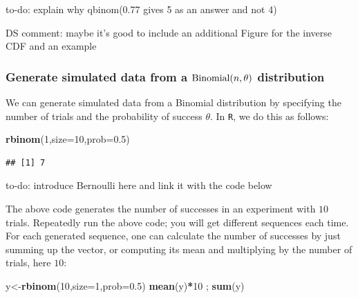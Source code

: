 \documentclass[12pt,]{krantz}
\newenvironment{Shaded}{\begin{snugshade}}{\end{snugshade}}
\newcommand{\DataTypeTok}[1]{\textcolor[rgb]{0.13,0.29,0.53}{#1}}
\newcommand{\DecValTok}[1]{\textcolor[rgb]{0.00,0.00,0.81}{#1}}
\newcommand{\FloatTok}[1]{\textcolor[rgb]{0.00,0.00,0.81}{#1}}
\newcommand{\KeywordTok}[1]{\textcolor[rgb]{0.13,0.29,0.53}{\textbf{#1}}}
\newcommand{\NormalTok}[1]{#1}
\newcommand{\OperatorTok}[1]{\textcolor[rgb]{0.81,0.36,0.00}{\textbf{#1}}}
\theoremstyle{definition}
\theoremstyle{definition}
\theoremstyle{definition}
\theoremstyle{remark}
\let\BeginKnitrBlock\begin \let\EndKnitrBlock\end
\begin{document}
\BeginKnitrBlock{rmdnote}
to-do: explain why qbinom(0.77 gives 5 as an answer and not 4)
\EndKnitrBlock{rmdnote}

\BeginKnitrBlock{rmdnote}
DS comment: maybe it's good to include an additional Figure for the inverse CDF and an example
\EndKnitrBlock{rmdnote}

\hypertarget{generate-simulated-data-from-a-hboxbinomialntheta-distribution}{%
\subsubsection{\texorpdfstring{Generate simulated data from a \(\hbox{Binomial}(n,\theta)\) distribution}{Generate simulated data from a \textbackslash{}hbox\{Binomial\}(n,\textbackslash{}theta) distribution}}\label{generate-simulated-data-from-a-hboxbinomialntheta-distribution}}

We can generate simulated data from a Binomial distribution by specifying the number of trials and the probability of success \(\theta\). In \texttt{R}, we do this as follows:

\begin{Shaded}
\begin{Highlighting}[]
\KeywordTok{rbinom}\NormalTok{(}\DecValTok{1}\NormalTok{,}\DataTypeTok{size=}\DecValTok{10}\NormalTok{,}\DataTypeTok{prob=}\FloatTok{0.5}\NormalTok{)}
\end{Highlighting}
\end{Shaded}

\begin{verbatim}
## [1] 7
\end{verbatim}

\BeginKnitrBlock{rmdnote}
to-do: introduce Bernoulli here and link it with the code below
\EndKnitrBlock{rmdnote}

The above code generates the number of successes in an experiment with \(10\) trials. Repeatedly run the above code; you will get different sequences each time. For each generated sequence, one can calculate the number of successes by just summing up the vector, or computing its mean and multiplying by the number of trials, here \(10\):

\begin{Shaded}
\begin{Highlighting}[]
\NormalTok{y<-}\KeywordTok{rbinom}\NormalTok{(}\DecValTok{10}\NormalTok{,}\DataTypeTok{size=}\DecValTok{1}\NormalTok{,}\DataTypeTok{prob=}\FloatTok{0.5}\NormalTok{)}
\KeywordTok{mean}\NormalTok{(y)}\OperatorTok{*}\DecValTok{10}\NormalTok{ ; }\KeywordTok{sum}\NormalTok{(y)}
\end{Highlighting}
\end{Shaded}
\end{document}
